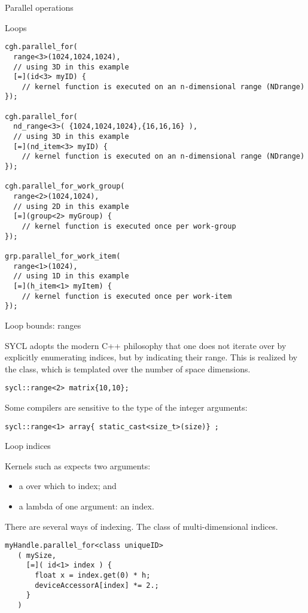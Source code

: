  {Parallel operations}

 {Loops}
  
\begin{lstlisting}
cgh.parallel_for(
  range<3>(1024,1024,1024),
  // using 3D in this example
  [=](id<3> myID) {
    // kernel function is executed on an n-dimensional range (NDrange)
});

cgh.parallel_for(
  nd_range<3>( {1024,1024,1024},{16,16,16} ),
  // using 3D in this example 
  [=](nd_item<3> myID) {
    // kernel function is executed on an n-dimensional range (NDrange)
});

cgh.parallel_for_work_group(
  range<2>(1024,1024),
  // using 2D in this example
  [=](group<2> myGroup) {
    // kernel function is executed once per work-group
});

grp.parallel_for_work_item(
  range<1>(1024),
  // using 1D in this example
  [=](h_item<1> myItem) {
    // kernel function is executed once per work-item
});
\end{lstlisting}

 {Loop bounds: ranges}

SYCL adopts the modern C++ philosophy that one does not iterate
over by explicitly enumerating indices, but by indicating their range.
This is realized by the  class,
which is templated over the number of space dimensions.

\begin{lstlisting}
sycl::range<2> matrix{10,10};
\end{lstlisting}

Some compilers are sensitive to the type of the integer arguments:
\begin{lstlisting}
sycl::range<1> array{ static_cast<size_t>(size)} ;
\end{lstlisting}

 {Loop indices}

Kernels such as 
expects two arguments:
\begin{itemize}
\item a  over which to index; and
\item a lambda of one argument: an index.
\end{itemize}

There are several ways of indexing.
The  class of multi-dimensional indices.
\begin{lstlisting}
myHandle.parallel_for<class uniqueID>
   ( mySize,
     [=]( id<1> index ) {
       float x = index.get(0) * h;
       deviceAccessorA[index] *= 2.;
     }
   )
\end{lstlisting}

